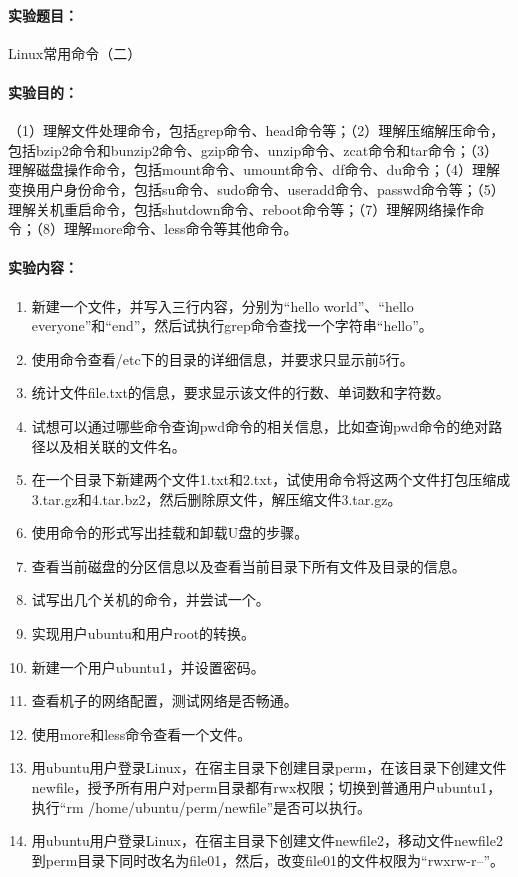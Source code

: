 \documentclass[cs4size,a4paper,nofonts]{ctexart}
\def\titlec{Linux常用命令（二）}
\begin{document}




\paragraph{实验题目：}\titlec

\paragraph{实验目的：}（1）理解文件处理命令，包括grep命令、head命令等；（2）理解压缩解压命令，包括bzip2命令和bunzip2命令、gzip命令、unzip命令、zcat命令和tar命令；（3）理解磁盘操作命令，包括mount命令、umount命令、df命令、du命令；（4）理解变换用户身份命令，包括su命令、sudo命令、useradd命令、passwd命令等；（5）理解关机重启命令，包括shutdown命令、reboot命令等；（7）理解网络操作命令；（8）理解more命令、less命令等其他命令。

\paragraph{实验内容：}
\begin{enumerate}
\item 新建一个文件，并写入三行内容，分别为“hello world”、“hello everyone”和“end”，然后试执行grep命令查找一个字符串“hello”。
\item 使用命令查看/etc下的目录的详细信息，并要求只显示前5行。
\item 统计文件file.txt的信息，要求显示该文件的行数、单词数和字符数。
\item 试想可以通过哪些命令查询pwd命令的相关信息，比如查询pwd命令的绝对路径以及相关联的文件名。
\item 在一个目录下新建两个文件1.txt和2.txt，试使用命令将这两个文件打包压缩成3.tar.gz和4.tar.bz2，然后删除原文件，解压缩文件3.tar.gz。
\item 使用命令的形式写出挂载和卸载U盘的步骤。
\item 查看当前磁盘的分区信息以及查看当前目录下所有文件及目录的信息。
\item 试写出几个关机的命令，并尝试一个。
\item 实现用户ubuntu和用户root的转换。
\item 新建一个用户ubuntu1，并设置密码。
\item 查看机子的网络配置，测试网络是否畅通。
\item 使用more和less命令查看一个文件。
\item 用ubuntu用户登录Linux，在宿主目录下创建目录perm，在该目录下创建文件newfile，授予所有用户对perm目录都有rwx权限；切换到普通用户ubuntu1，执行“rm /home/ubuntu/perm/newfile”是否可以执行。
\item 用ubuntu用户登录Linux，在宿主目录下创建文件newfile2，移动文件newfile2到perm目录下同时改名为file01，然后，改变file01的文件权限为“rwxrw-r--”。
\end{enumerate}
\end{document}
